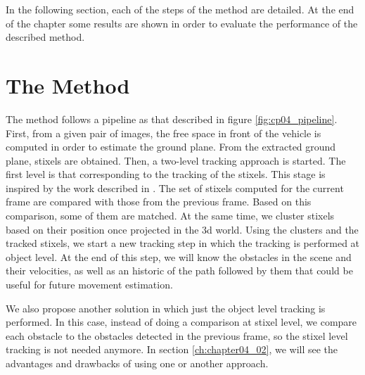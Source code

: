 In the following section, each of the steps of the method are detailed. At the end of the chapter some results are shown in order to evaluate the performance of the described method.

\section{The Method}\label{ch:chapter04_01}

The method follows a pipeline as that described in figure \ref{fig:cp04_pipeline}. First, from a given pair of images, the free space in front of the vehicle is computed in order to estimate the ground plane. From the extracted ground plane, stixels are obtained. Then, a two-level tracking approach is started. The first level is that corresponding to the tracking of the stixels. This stage is inspired by the work described in \cite{gunyel2012stixels}. The set of stixels computed for the current frame are compared with those from the previous frame. Based on this comparison, some of them are matched. At the same time, we cluster stixels based on their position once projected in the 3d world. Using the clusters and the tracked stixels, we start a new tracking step in which the tracking is performed at object level. At the end of this step, we will know the obstacles in the scene and their velocities, as well as an historic of the path followed by them that could be useful for future movement estimation.

We also propose another solution in which just the object level tracking is performed. In this case, instead of doing a comparison at stixel level, we compare each obstacle to the obstacles detected in the previous frame, so the stixel level tracking is not needed anymore. In section \ref{ch:chapter04_02}, we will see the advantages and drawbacks of using one or another approach.

